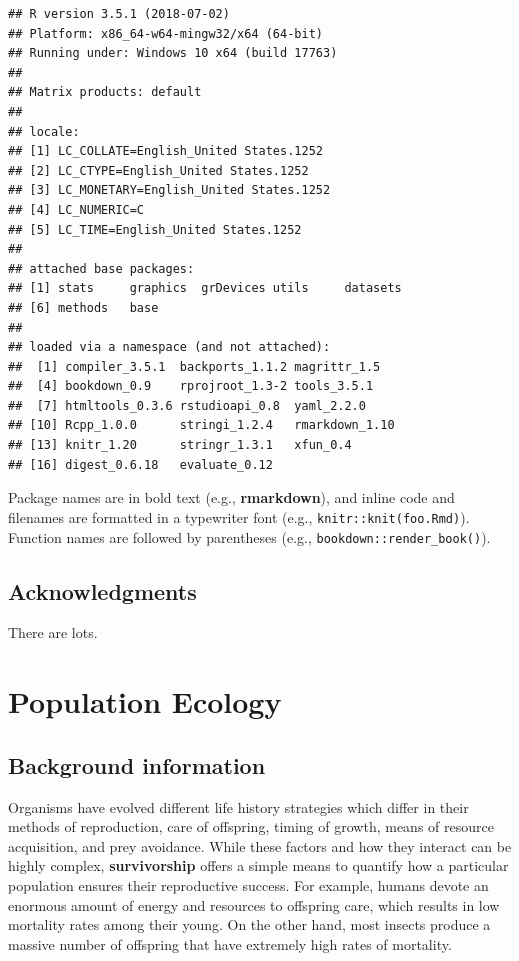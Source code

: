 \documentclass[]{book}
\begin{document}
\begin{verbatim}
## R version 3.5.1 (2018-07-02)
## Platform: x86_64-w64-mingw32/x64 (64-bit)
## Running under: Windows 10 x64 (build 17763)
## 
## Matrix products: default
## 
## locale:
## [1] LC_COLLATE=English_United States.1252 
## [2] LC_CTYPE=English_United States.1252   
## [3] LC_MONETARY=English_United States.1252
## [4] LC_NUMERIC=C                          
## [5] LC_TIME=English_United States.1252    
## 
## attached base packages:
## [1] stats     graphics  grDevices utils     datasets 
## [6] methods   base     
## 
## loaded via a namespace (and not attached):
##  [1] compiler_3.5.1  backports_1.1.2 magrittr_1.5   
##  [4] bookdown_0.9    rprojroot_1.3-2 tools_3.5.1    
##  [7] htmltools_0.3.6 rstudioapi_0.8  yaml_2.2.0     
## [10] Rcpp_1.0.0      stringi_1.2.4   rmarkdown_1.10 
## [13] knitr_1.20      stringr_1.3.1   xfun_0.4       
## [16] digest_0.6.18   evaluate_0.12
\end{verbatim}

Package names are in bold text (e.g., \textbf{rmarkdown}), and inline code and filenames are formatted in a typewriter font (e.g., \texttt{knitr::knit(\textquotesingle{}foo.Rmd\textquotesingle{})}). Function names are followed by parentheses (e.g., \texttt{bookdown::render\_book()}).

\hypertarget{acknowledgments}{%
\section*{Acknowledgments}\label{acknowledgments}}


There are lots.

\mainmatter

\hypertarget{population}{%
\chapter{Population Ecology}\label{population}}

\hypertarget{background-information}{%
\section{Background information}\label{background-information}}

Organisms have evolved different life history strategies which differ in their methods of reproduction, care of offspring, timing of growth, means of resource acquisition, and prey avoidance. While these factors and how they interact can be highly complex, \textbf{survivorship} offers a simple means to quantify how a particular population ensures their reproductive success. For example, humans devote an enormous amount of energy and resources to offspring care, which results in low mortality rates among their young. On the other hand, most insects produce a massive number of offspring that have extremely high rates of mortality.
\end{document}
